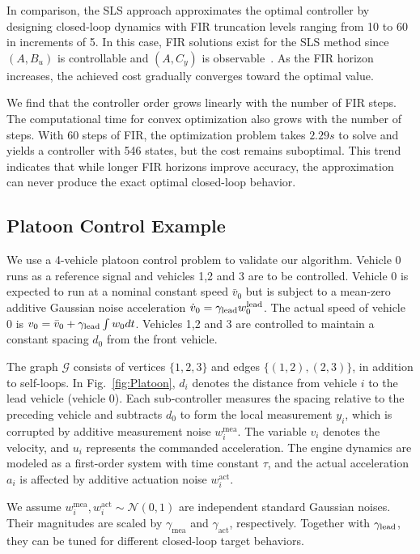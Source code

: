 In comparison, the SLS approach approximates the optimal controller by designing closed-loop dynamics with FIR truncation levels ranging from 10 to 60 in increments of 5. In this case, FIR solutions exist for the SLS method since \((A,B_u)\) is controllable and \((A, C_y)\) is observable~\cite{SLSparametrization}. As the FIR horizon increases, the achieved cost gradually converges toward the optimal value.

We find that the controller order grows linearly with the number of FIR steps. The computational time for convex optimization also grows with the number of steps. With 60 steps of FIR, the optimization problem takes \(2.29s\) to solve and yields a controller with 546 states, but the cost remains suboptimal. This trend indicates that while longer FIR horizons improve accuracy, the approximation can never produce the exact optimal closed-loop behavior.


\subsection{Platoon Control Example}
We use a 4-vehicle platoon control problem to validate our algorithm. Vehicle 0 runs as a reference signal and vehicles 1,2 and 3 are to be controlled. Vehicle 0 is expected to run at a nominal constant speed \(\bar{v}_0\) but is subject to a mean-zero additive Gaussian noise acceleration \(\dot{v}_0 = \gamma_{\rm{lead}} w_0^{\rm{lead}}\). The actual speed of vehicle 0 is \(v_0 = \bar{v}_0+ \gamma_{\rm{lead}} \int w_0 dt\). Vehicles 1,2 and 3 are controlled to maintain a constant spacing \(d_0\) from the front vehicle.

The graph $\mathcal{G}$ consists of vertices $\{1,2,3\}$ and edges $\{(1,2),(2,3)\}$, in addition to self-loops. 
In Fig.~\ref{fig:Platoon}, $d_i$ denotes the distance from vehicle $i$ to the lead vehicle (vehicle 0). 
Each sub-controller measures the spacing relative to the preceding vehicle and subtracts $d_0$ to form the local measurement $y_i$, which is corrupted by additive measurement noise $w_{i}^{\mathrm{mea}}$. 
The variable $v_i$ denotes the velocity, and $u_i$ represents the commanded acceleration. 
The engine dynamics are modeled as a first-order system with time constant $\tau$, and the actual acceleration $a_i$ is affected by additive actuation noise $w_{i}^{\mathrm{act}}$.

We assume $w_{i}^{\mathrm{mea}}, w_{i}^{\mathrm{act}} \sim \mathcal{N}(0,1)$ are independent standard Gaussian noises. 
Their magnitudes are scaled by $\gamma_{\mathrm{mea}}$ and $\gamma_{\mathrm{act}}$, respectively. Together with \(\gamma_{\rm{lead}}\), they can be tuned for different closed-loop target behaviors. 


